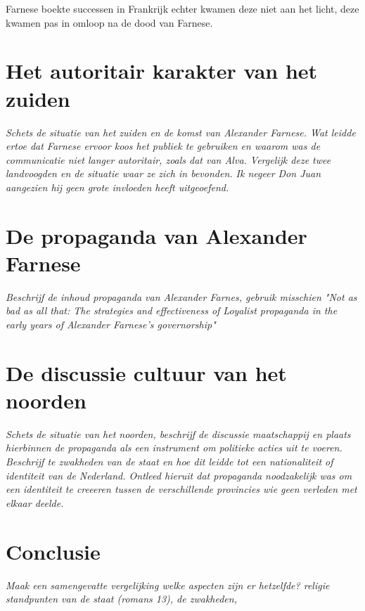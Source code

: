 \documentclass[11pt]{amsart}
\begin{document}
Farnese boekte successen in Frankrijk echter kwamen deze niet aan het licht, deze kwamen pas in omloop na de dood van
Farnese.

\newpage

\section{Het autoritair karakter van het zuiden}
\textit{Schets de situatie van het zuiden en de komst van Alexander Farnese. Wat leidde ertoe dat Farnese ervoor koos het
     publiek te gebruiken en waarom was de communicatie niet langer autoritair, zoals dat van Alva. Vergelijk deze twee
     landvoogden en de situatie waar ze zich in bevonden. Ik negeer Don Juan aangezien hij geen grote invloeden heeft
     uitgeoefend.}

\section{De propaganda van Alexander Farnese}
\textit{Beschrijf de inhoud propaganda van Alexander Farnes, gebruik misschien "Not as bad as all that: The strategies and effectiveness of Loyalist propaganda in the early years of Alexander Farnese's governorship"}

\section{De discussie cultuur van het noorden}
\textit{Schets de situatie van het noorden, beschrijf de discussie maatschappij en plaats hierbinnen de propaganda als een
     instrument om politieke acties uit te voeren. Beschrijf te zwakheden van de staat en hoe dit leidde tot een nationaliteit of identiteit van de Nederland. Ontleed hieruit dat propaganda noodzakelijk was om een identiteit te creeeren tussen de verschillende provincies wie geen verleden met elkaar deelde. }

\section{Conclusie}
\textit{Maak een samengevatte vergelijking welke aspecten zijn er hetzelfde? religie standpunten van de staat (romans 13), de zwakheden, }

\newpage\printbibliography{}
\end{document}
